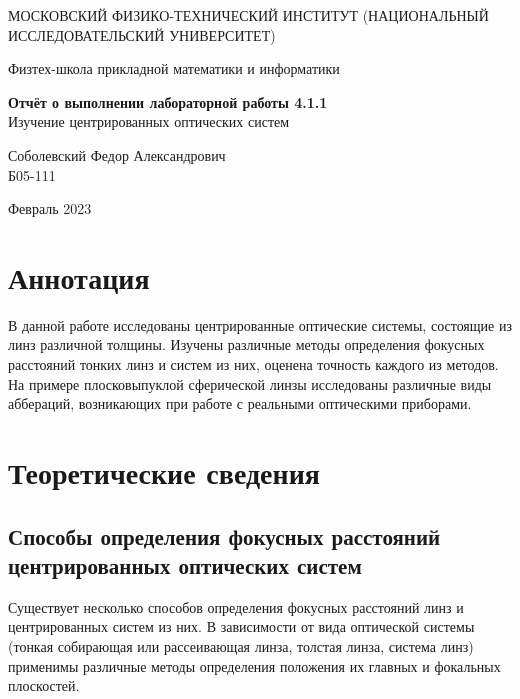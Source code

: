 \documentclass[a4paper,12pt]{article} %
\date{\today}
\begin{document}
\begin{titlepage}
	\begin{center}
		{\large МОСКОВСКИЙ ФИЗИКО-ТЕХНИЧЕСКИЙ ИНСТИТУТ (НАЦИОНАЛЬНЫЙ ИССЛЕДОВАТЕЛЬСКИЙ УНИВЕРСИТЕТ)}
	\end{center}
	\begin{center}
		{\large Физтех-школа прикладной математики и информатики}
	\end{center}
	
	
	\vspace{4.5cm}
	{\huge
		\begin{center}
			{\bf Отчёт о выполнении лабораторной работы 4.1.1}\\
			Изучение центрированных оптических систем
		\end{center}
	}
	\vspace{1cm}
	\begin{center}
		{\large Соболевский Федор Александрович \\
			\vspace{0.2cm}
			Б05-111}
	\end{center}
	\vspace{8cm}
	\begin{center}
		Февраль 2023
	\end{center}
\end{titlepage}

\section{Аннотация}

В данной работе исследованы центрированные оптические системы, состоящие из линз различной толщины. Изучены различные методы определения фокусных расстояний тонких линз и систем из них, оценена точность каждого из методов. На примере плосковыпуклой сферической линзы исследованы различные виды аббераций, возникающих при работе с реальными оптическими приборами.

\section{Теоретические сведения}

\subsection{Способы определения фокусных расстояний центрированных оптических систем}

Существует несколько способов определения фокусных расстояний линз и центрированных систем из них. В зависимости от вида оптической системы (тонкая собирающая или рассеивающая линза, толстая линза, система линз) применимы различные методы определения положения их главных и фокальных плоскостей.
\end{document}
